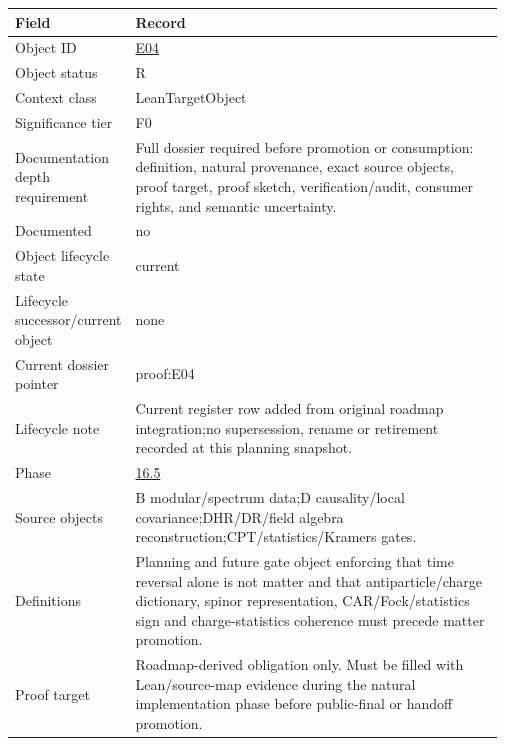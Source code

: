 \begin{longtable}{L{0.16\linewidth} L{0.81\linewidth}}
\hline
\textbf{Field} & \textbf{Record}\\
\hline
Object ID & \hyperlink{object-row-E04}{E04}\\
\hline\addlinespace[0.20em]
Object status & R\\
\hline\addlinespace[0.20em]
Context class & LeanTargetObject\\
\hline\addlinespace[0.20em]
Significance tier & F0\\
\hline\addlinespace[0.20em]
Documentation depth requirement & Full dossier required before promotion or consumption: definition, natural provenance, exact source objects, proof target, proof sketch, verification/\allowbreak{}audit, consumer rights, and semantic uncertainty.\\
\hline\addlinespace[0.20em]
Documented & no\\
\hline\addlinespace[0.20em]
Object lifecycle state & current\\
\hline\addlinespace[0.20em]
Lifecycle successor/\allowbreak{}current object & none\\
\hline\addlinespace[0.20em]
Current dossier pointer & proof:E04\\
\hline\addlinespace[0.20em]
Lifecycle note & Current register row added from original roadmap integration;\newline no supersession, rename or retirement recorded at this planning snapshot.\\
\hline\addlinespace[0.20em]
Phase & \hyperlink{phase-row-16-5}{16.5}\\
\hline\addlinespace[0.20em]
Source objects & B modular/\allowbreak{}spectrum data;\newline D causality/\allowbreak{}local covariance;\newline DHR/\allowbreak{}DR/\allowbreak{}field algebra reconstruction;\newline CPT/\allowbreak{}statistics/\allowbreak{}Kramers gates.\\
\hline\addlinespace[0.20em]
Definitions & Planning and future gate object enforcing that time reversal alone is not matter and that antiparticle/\allowbreak{}charge dictionary, spinor representation, CAR/\allowbreak{}Fock/\allowbreak{}statistics sign and charge-statistics coherence must precede matter promotion.\\
\hline\addlinespace[0.20em]
Proof target & Roadmap-derived obligation only. Must be filled with Lean/\allowbreak{}source-map evidence during the natural implementation phase before public-final or handoff promotion.\\

\end{longtable}

